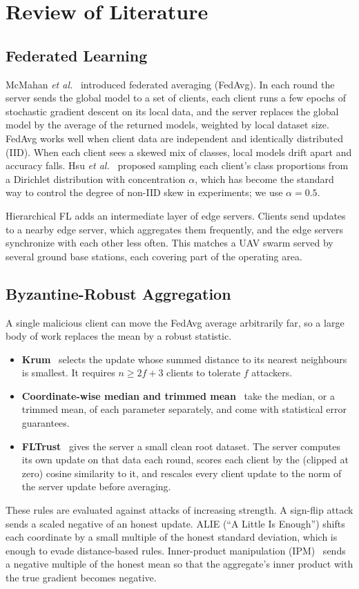 \chapter{Review of Literature}
\label{ch:lit}

\section{Federated Learning}
McMahan \textit{et al.}~\cite{mcmahan2017fedavg} introduced federated averaging
(FedAvg). In each round the server sends the global model to a set of clients, each
client runs a few epochs of stochastic gradient descent on its local data, and the
server replaces the global model by the average of the returned models, weighted by
local dataset size. FedAvg works well when client data are independent and
identically distributed (IID). When each client sees a skewed mix of classes, local
models drift apart and accuracy falls. Hsu \textit{et al.}~\cite{hsu2019noniid}
proposed sampling each client's class proportions from a Dirichlet distribution with
concentration $\alpha$, which has become the standard way to control the degree of
non-IID skew in experiments; we use $\alpha=0.5$.

Hierarchical FL adds an intermediate layer of edge servers. Clients send updates to a
nearby edge server, which aggregates them frequently, and the edge servers
synchronize with each other less often. This matches a UAV swarm served by several
ground base stations, each covering part of the operating area.

\section{Byzantine-Robust Aggregation}
A single malicious client can move the FedAvg average arbitrarily far, so a large
body of work replaces the mean by a robust statistic.
\begin{itemize}
\item \textbf{Krum}~\cite{blanchard2017krum} selects the update whose summed distance
  to its nearest neighbours is smallest. It requires $n\ge 2f+3$ clients to tolerate
  $f$ attackers.
\item \textbf{Coordinate-wise median and trimmed mean}~\cite{yin2018median} take the
  median, or a trimmed mean, of each parameter separately, and come with statistical
  error guarantees.
\item \textbf{FLTrust}~\cite{cao2021fltrust} gives the server a small clean root
  dataset. The server computes its own update on that data each round, scores each
  client by the (clipped at zero) cosine similarity to it, and rescales every client
  update to the norm of the server update before averaging.
\end{itemize}
These rules are evaluated against attacks of increasing strength. A sign-flip attack
sends a scaled negative of an honest update. ALIE (``A Little Is Enough'')
\cite{baruch2019alie} shifts each coordinate by a small multiple of the honest
standard deviation, which is enough to evade distance-based rules. Inner-product
manipulation (IPM)~\cite{xie2019ipm} sends a negative multiple of the honest mean so
that the aggregate's inner product with the true gradient becomes negative.


